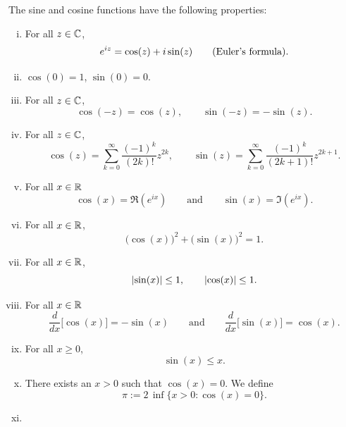 \pagebreak[2]
\begin{prop}
The sine and cosine functions have the following properties:
\begin{enumerate}[(i)]
\item For all $z \in {\mathbb{C}}$,
\begin{equation*}
e^{iz} = \cos(z) + i\sin(z) \qquad
\text{(\myindex{Euler's formula})}.
\end{equation*}
\item $\cos(0) = 1$, $\sin(0) = 0$.
\item For all $z \in {\mathbb{C}}$,
\begin{equation*}
\cos(-z) = \cos(z), \qquad
\sin(-z) = -\sin(z).
\end{equation*}
\item For all $z \in {\mathbb{C}}$,
\begin{equation*}
\cos(z) = \sum_{k=0}^\infty \frac{{(-1)}^k}{(2k)!} z^{2k} ,
\qquad
\sin(z) = \sum_{k=0}^\infty \frac{{(-1)}^k}{(2k+1)!} z^{2k+1} .
\end{equation*}
\item For all $x \in {\mathbb{R}}$
\begin{equation*}
\cos(x) = \Re (e^{ix})
\qquad\text{and}\qquad
\sin(x) = \Im (e^{ix}) .
\end{equation*}
\item For all $x \in {\mathbb{R}}$,
\begin{equation*}
{\bigl( \cos(x) \bigr)}^2 + {\bigl( \sin(x) \bigr)}^2 = 1 .
\end{equation*}
\item For all $x \in {\mathbb{R}}$,
\begin{equation*}
\lvert {\sin(x)} \rvert \leq 1, \qquad \lvert {\cos(x)} \rvert \leq 1 .
\end{equation*}
\item For all $x \in {\mathbb{R}}$
\begin{equation*}
\frac{d}{dx} \bigl[ \cos(x) \bigr] = -\sin(x)
\qquad \text{and} \qquad
\frac{d}{dx} \bigl[ \sin(x) \bigr] = \cos(x) .
\end{equation*}
\item For all $x \geq 0$,
\begin{equation*}
\sin(x) \leq x .
\end{equation*}
\item
There exists an $x > 0$ such that $\cos(x) = 0$.  We define
\begin{equation*}
\pi := 2 \, \inf \{ x > 0 : \cos(x) = 0 \} .
\end{equation*}
\item

\end{enumerate}
\end{prop}

